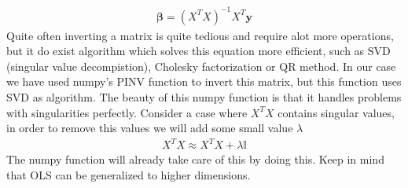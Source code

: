 \documentclass[a4paper, 10pt]{article}
\begin{document}
\begin{align}
  \boldsymbol{\beta} =(X^{T}X)^{-1}X^{T}\mathbf{y}
\end{align}
Quite often inverting a matrix is quite tedious and require alot more operations, but it do exist algorithm which solves this equation more efficient, such as SVD (singular value decompistion), Cholesky factorization or QR method. In our case we have used numpy's PINV function to invert this matrix, but this function uses SVD as algorithm. The beauty of this numpy function is that it handles problems with singularities perfectly. Consider a case where $X^{T}X$ contains singular values, in order to remove this values we will add some small value $\lambda$
\begin{align}
  X^{T}X \approx X^{T}X + \lambda\mathbb{I}
\end{align}
The numpy function will already take care of this by doing this.  Keep in mind that OLS can be generalized to higher dimensions.
\end{document}
